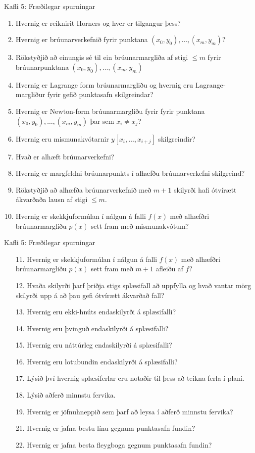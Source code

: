 \begin{frame}{Kafli 5: Fræðilegar spurningar}
  \begin{enumerate}
  \item  Hvernig er reiknirit Horners og hver er tilgangur þess?
  \item  Hvernig er brúunarverkefnið fyrir punktana 
$(x_0,y_0),\dots,(x_m,y_m)$?
  \item  Rökstyðjið að einungis sé til ein brúunarmargliða 
af stigi $\leq m$ fyrir 
brúunarpunktana $(x_0,y_0),\dots,(x_m,y_m)$
  \item Hvernig er Lagrange form brúunarmargliðu og hvernig eru
    Lagrange-margliður fyrir gefið punktasafn skilgreindar?  
  \item  Hvernig er Newton-form brúunarmargliðu fyrir 
 fyrir punktana $(x_0,y_0),\dots,(x_m,y_m)$ þar sem
$x_i\neq x_j$?
  \item  Hvernig eru mismunakvótarnir $y[x_i,\ldots,x_{i+j}]$
    skilgreindir?
  \item Hvað er alhæft brúunarverkefni? 
  \item Hvernig er margfeldni brúunarpunkts í alhæfðu brúunarverkefni 
skilgreind?
  \item Rökstyðjið að alhæfða brúunarverkefnið með $m+1$ skilyrði
hafi ótvírætt ákvarðaða lausn af stigi $\leq m$.  
  \item  Hvernig er skekkjuformúlan í nálgun á falli $f(x)$ með alhæfðri
    brúunarmargliðu $p(x)$ sett fram með mismunakvótum?
  \end{enumerate}
\end{frame}

\begin{frame}{Kafli 5: Fræðilegar spurningar}
  \begin{enumerate}
  \item [11.]  Hvernig er skekkjuformúlan í nálgun á falli $f(x)$ með alhæfðri
    brúunarmargliðu $p(x)$ sett fram með $m+1$ afleiðu af $f$?
  \item [12.]  Hvaða skilyrði þarf þriðja stigs splæsifall að uppfylla 
og hvað vantar mörg skilyrði upp á að þau gefi ótvírætt ákvarðað fall?
  \item  [13.] Hvernig eru ekki-hnúts endaskilyrði á splæsifalli?
  \item  [14.] Hvernig eru þvinguð endaskilyrði á splæsifalli?
  \item  [15.] Hvernig eru náttúrleg endaskilyrði á splæsifalli?
  \item  [16.] Hvernig eru lotubundin endaskilyrði á splæsifalli?
  \item  [17.] Lýsið því hvernig splæsiferlar eru notaðir til þess að
    teikna ferla í plani.
  \item  [18.] Lýsið aðferð minnstu fervika.  
  \item  [19.] Hvernig er jöfnuhneppið
    sem þarf að leysa í aðferð minnstu fervika?
  \item  [21.] Hvernig er jafna bestu línu gegnum punktasafn fundin?
  \item  [22.] Hvernig er jafna besta fleygboga gegnum punktasafn fundin?
   \end{enumerate}
\end{frame}

